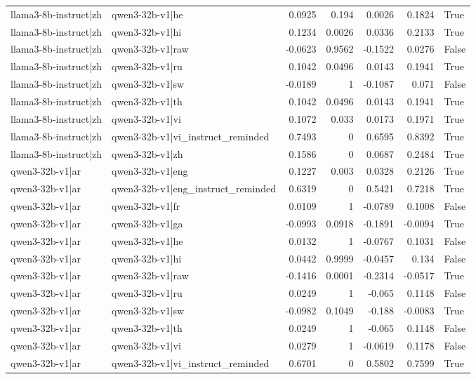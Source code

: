 \begin{table}
\begin{tabular}{l l r r r r l}
llama3-8b-instruct|zh & qwen3-32b-v1|he & 0.0925 & 0.194 & 0.0026 & 0.1824 & True \\
llama3-8b-instruct|zh & qwen3-32b-v1|hi & 0.1234 & 0.0026 & 0.0336 & 0.2133 & True \\
llama3-8b-instruct|zh & qwen3-32b-v1|raw & -0.0623 & 0.9562 & -0.1522 & 0.0276 & False \\
llama3-8b-instruct|zh & qwen3-32b-v1|ru & 0.1042 & 0.0496 & 0.0143 & 0.1941 & True \\
llama3-8b-instruct|zh & qwen3-32b-v1|sw & -0.0189 & 1 & -0.1087 & 0.071 & False \\
llama3-8b-instruct|zh & qwen3-32b-v1|th & 0.1042 & 0.0496 & 0.0143 & 0.1941 & True \\
llama3-8b-instruct|zh & qwen3-32b-v1|vi & 0.1072 & 0.033 & 0.0173 & 0.1971 & True \\
llama3-8b-instruct|zh & qwen3-32b-v1|vi_instruct_reminded & 0.7493 & 0 & 0.6595 & 0.8392 & True \\
llama3-8b-instruct|zh & qwen3-32b-v1|zh & 0.1586 & 0 & 0.0687 & 0.2484 & True \\
qwen3-32b-v1|ar & qwen3-32b-v1|eng & 0.1227 & 0.003 & 0.0328 & 0.2126 & True \\
qwen3-32b-v1|ar & qwen3-32b-v1|eng_instruct_reminded & 0.6319 & 0 & 0.5421 & 0.7218 & True \\
qwen3-32b-v1|ar & qwen3-32b-v1|fr & 0.0109 & 1 & -0.0789 & 0.1008 & False \\
qwen3-32b-v1|ar & qwen3-32b-v1|ga & -0.0993 & 0.0918 & -0.1891 & -0.0094 & True \\
qwen3-32b-v1|ar & qwen3-32b-v1|he & 0.0132 & 1 & -0.0767 & 0.1031 & False \\
qwen3-32b-v1|ar & qwen3-32b-v1|hi & 0.0442 & 0.9999 & -0.0457 & 0.134 & False \\
qwen3-32b-v1|ar & qwen3-32b-v1|raw & -0.1416 & 0.0001 & -0.2314 & -0.0517 & True \\
qwen3-32b-v1|ar & qwen3-32b-v1|ru & 0.0249 & 1 & -0.065 & 0.1148 & False \\
qwen3-32b-v1|ar & qwen3-32b-v1|sw & -0.0982 & 0.1049 & -0.188 & -0.0083 & True \\
qwen3-32b-v1|ar & qwen3-32b-v1|th & 0.0249 & 1 & -0.065 & 0.1148 & False \\
qwen3-32b-v1|ar & qwen3-32b-v1|vi & 0.0279 & 1 & -0.0619 & 0.1178 & False \\
qwen3-32b-v1|ar & qwen3-32b-v1|vi_instruct_reminded & 0.6701 & 0 & 0.5802 & 0.7599 & True \\

\end{tabular}
\end{table}
